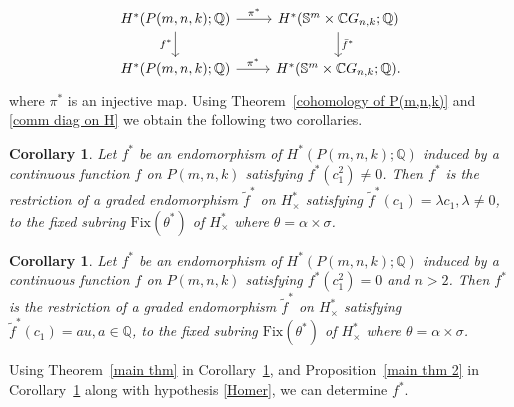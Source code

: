 \documentclass{amsart}
\newtheorem{corollary}[theorem]{Corollary}
\newcommand{\thmref}[1]{Theorem~\ref{#1}}
\newcommand{\propref}[1]{Proposition~\ref{#1}}
\newcommand{\corref}[1]{Corollary~\ref{#1}}
\begin{document}
	\begin{equation}\label{comm diag on H}
		\begin{tikzcd}
			{H^*(P(m,n,k);\mathbb Q)}  & {H^*(\mathbb S^m\times \mathbb CG_{n,k};\mathbb Q)} \\
			{H^*(P(m,n,k);\mathbb Q)} & {H^*(\mathbb S^m\times \mathbb CG_{n,k};\mathbb Q).}
			\arrow["{\pi^*}", from=1-1, to=1-2]
			\arrow["{f^*}"', from=1-1, to=2-1]
			\arrow["{\bar f^*}", from=1-2, to=2-2]
			\arrow["{\pi^*}", from=2-1, to=2-2]
		\end{tikzcd}
	\end{equation}
	where $\pi^*$ is an injective map. Using \thmref{cohomology of P(m,n,k)} and \eqref{comm diag on H} we obtain the following two corollaries. 
	\begin{corollary}\label{cor3}
		Let %
$f^*$ be an endomorphism of $H^*(P(m,n,k); \mathbb{Q})$ induced by a continuous function $f$ on $P(m,n,k)$ satisfying $f^*(c_1^2) \ne 0$. Then
		$f^*$ is the restriction of a graded endomorphism $\tilde{f}^*$ on  $H^*_\times$ satisfying $\tilde{f}^*(c_1) = \lambda c_1, \lambda \neq 0$,  to the fixed subring $\mathrm{Fix}(\theta^*)$ %
of $H^*_\times$ where %
$\theta = \alpha\times \sigma$.
	\end{corollary}
	\begin{corollary}\label{cor4}
		Let $f^*$ be an endomorphism of $H^*(P(m,n,k); \mathbb{Q})$ induced by a continuous function $f$ on $P(m,n,k)$ satisfying $f^*(c_1^2) =0$ and $n>2$. Then
		$f^*$ is the restriction of a graded endomorphism $\tilde{f}^*$ on  $H^*_\times$ satisfying $\tilde{f}^*(c_1) = au, a \in \mathbb{Q}$,  to the fixed subring $\mathrm{Fix}(\theta^*)$ %
of $H^*_\times$ where %
$\theta = \alpha\times \sigma$.
	\end{corollary}
	Using \thmref{main thm} in \corref{cor3}, and \propref{main thm 2} in \corref{cor4} along with hypothesis \eqref{Homer}, we can determine $f^*$.
	
\end{document}
